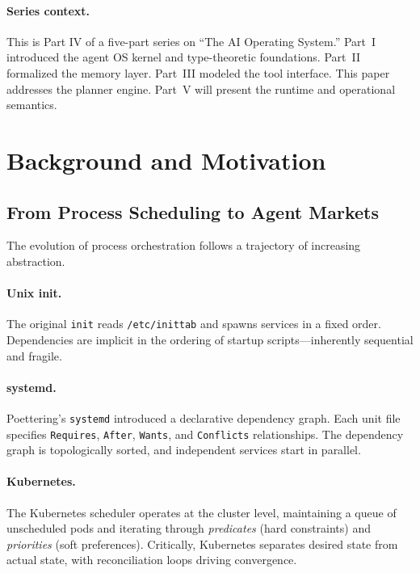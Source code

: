 \documentclass[12pt,a4paper]{article}
\theoremstyle{plain}
\theoremstyle{definition}
\begin{document}
\paragraph{Series context.} This is Part IV of a five-part series on ``The AI Operating System.'' Part~I \cite{long2026agentOS} introduced the agent OS kernel and type-theoretic foundations. Part~II \cite{long2026memory} formalized the memory layer. Part~III \cite{long2026tools} modeled the tool interface. This paper addresses the planner engine. Part~V will present the runtime and operational semantics.

\section{Background and Motivation}\label{sec:background}

\subsection{From Process Scheduling to Agent Markets}

The evolution of process orchestration follows a trajectory of increasing abstraction.

\paragraph{Unix init.} The original \texttt{init} reads \texttt{/etc/inittab} and spawns services in a fixed order. Dependencies are implicit in the ordering of startup scripts---inherently sequential and fragile.

\paragraph{systemd.} Poettering's \texttt{systemd} \cite{poettering2010systemd} introduced a declarative dependency graph. Each unit file specifies \texttt{Requires}, \texttt{After}, \texttt{Wants}, and \texttt{Conflicts} relationships. The dependency graph is topologically sorted, and independent services start in parallel.

\paragraph{Kubernetes.} The Kubernetes scheduler \cite{burns2016borg} operates at the cluster level, maintaining a queue of unscheduled pods and iterating through \emph{predicates} (hard constraints) and \emph{priorities} (soft preferences). Critically, Kubernetes separates desired state from actual state, with reconciliation loops driving convergence.
\end{document}

